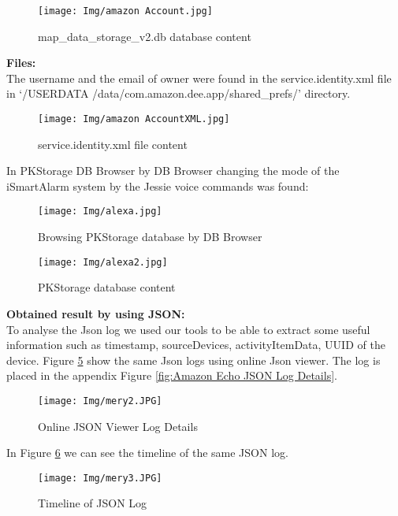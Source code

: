 \documentclass{easychair}
\begin{document}
\begin{figure}[H]
    \centering
    \texttt{[image: Img/amazon Account.jpg]}
    \caption{map\_data\_storage\_v2.db database content}
    \label{fig:my_label}
\end{figure}

\textbf{Files:}\\

The username and the email of owner were found in the service.identity.xml file in ‘/USERDATA /data/com.amazon.dee.app/shared\_prefs/’ directory.\\

\begin{figure}[H]
    \centering
    \texttt{[image: Img/amazon AccountXML.jpg]}
    \caption{service.identity.xml file content}
    \label{fig:my_label}
\end{figure}

In PKStorage DB Browser by DB Browser changing the mode of the iSmartAlarm system by the Jessie voice commands was found:\\
\begin{figure}[H]
    \centering
    \texttt{[image: Img/alexa.jpg]}
    \caption{Browsing PKStorage database by DB Browser}
    \label{fig:my_label}
\end{figure}
\begin{figure}[H]
    \centering
    \texttt{[image: Img/alexa2.jpg]}
    \caption{PKStorage database content}
    \label{fig:my_label}
\end{figure}
\newpage
\textbf{Obtained result by using JSON:}\\
To analyse the Json log we used our tools to be able to extract some useful information such as timestamp, sourceDevices, activityItemData, UUID of the device. Figure \ref{fig:JV} show the same Json logs using online Json viewer. The log is placed in the appendix Figure  \ref{fig:Amazon Echo JSON Log Details}.

\begin{figure}[H]
    \centering
    \texttt{[image: Img/mery2.JPG]}
    \caption{Online JSON Viewer Log Details}
    \label{fig:JV}
\end{figure}

In Figure \ref{fig:Timeline of JSon Log} we can see the timeline of the same JSON log.
\begin{figure}[H]
    \centering
    \texttt{[image: Img/mery3.JPG]}
    \caption{Timeline of JSON Log }
    \label{fig:Timeline of JSon Log}
\end{figure}
\end{document}
